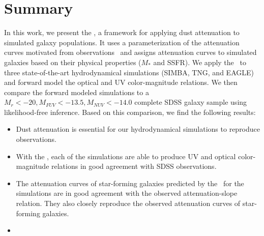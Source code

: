 \section{Summary}
In this work, we present the \eda, a framework for applying dust attenuation to
simulated galaxy populations. It uses a parameterization of 
the attenuation curves motivated from observations~\citep{noll2009} and
assigns attenuation curves to simulated galaxies based on their physical properties ($M_*$ and SSFR).
We apply the \eda~to 
three state-of-the-art hydrodynamical simulations (SIMBA, TNG, and EAGLE) and
forward model the optical and UV color-magnitude relations. We then compare
the forward modeled simulations to a $M_r < -20, M_{FUV} < -13.5, M_{NUV} <
-14.0$ complete SDSS galaxy sample using likelihood-free inference. Based on
this comparison, we find the following results: 

\begin{itemize}
    \item Dust attenuation is essential for our hydrodynamical simulations to
        reproduce observations.
    \item With the \eda, each of the simulations are able to produce UV and
        optical color-magnitude relations in good agreement with SDSS
        observations. 
    \item The attenuation curves of star-forming galaxies predicted by the
        \eda~for the simulations are in good agreement with the observed
        attenuation-slope relation. 
        They also closely reproduce the observed attenuation curves
        of star-forming galaxies. 
    \item {}
\end{itemize}

